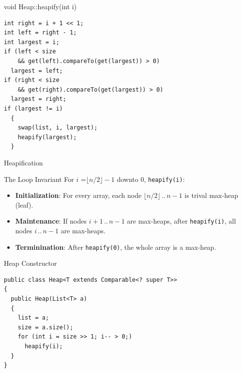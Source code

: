 \documentclass[pdf]{beamer}
\begin{document}
\begin{frame}[fragile]{void Heap::heapify(int i)}
\begin{verbatim}
int right = i + 1 << 1;
int left = right - 1;
int largest = i;
if (left < size
    && get(left).compareTo(get(largest)) > 0)
  largest = left;
if (right < size
    && get(right).compareTo(get(largest)) > 0)
  largest = right;
if (largest != i)
  {
    swap(list, i, largest);
    heapify(largest);
  }
\end{verbatim}
\end{frame}

\begin{frame}{Heapification}\huge
  \begin{center}
  \end{center}
\end{frame}

\begin{frame}[fragile]{The Loop Invariant}\Large
  For $i$ =$\lfloor n/2\rfloor - 1$ downto $0$, \verb|heapify(i)|:
  \begin{itemize}
    \item \textbf{Initialization}: For every array,
      each node $\lfloor n/2\rfloor\,..\,n-1$ is trival max-heap (leaf).
    \item \textbf{Maintenance}: If nodes $i+1\,..\,n-1$ are max-heaps,
      after \verb|heapify(i)|, all nodes $i\,..\,n-1$ are max-heaps.
    \item \textbf{Terminination}: After \verb|heapify(0)|,
      the whole array is a max-heap.
  \end{itemize}
\end{frame}

\begin{frame}[fragile]{Heap Constructor}
\begin{verbatim}
public class Heap<T extends Comparable<? super T>>
{
  public Heap(List<T> a)
  {
    list = a;
    size = a.size();
    for (int i = size >> 1; i-- > 0;)
      heapify(i);
  }
}
\end{verbatim}
\end{frame}
\end{document}
